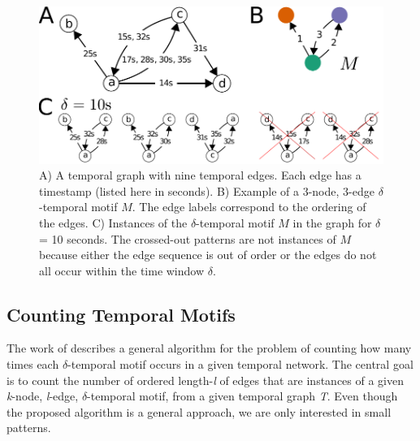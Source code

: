 \documentclass[../../thesis.tex]{subfiles}
\begin{document}
\begin{figure}[H]
\centering
\begin{subfigure}[b]{0.3\textwidth}\label{fig:intro1A}\end{subfigure}
\begin{subfigure}[b]{0.3\textwidth}\label{fig:intro1B}\end{subfigure}
\begin{subfigure}[b]{0.3\textwidth}\label{fig:intro1C}\end{subfigure}
\includegraphics[width=\columnwidth]{content/unveiling/img/intro1}
\caption{%
\textnormal{A}) A temporal graph with nine temporal edges.  Each edge
has a timestamp (listed here in seconds).
%
\textnormal{B}) Example of a $3$-node, $3$-edge $\delta$-temporal motif $M$.  The
edge labels correspond to the ordering of the edges.
%
\textnormal{C})
Instances of the $\delta$-temporal motif $M$ in the graph for $\delta$ = 10
seconds.  The crossed-out patterns are not instances of $M$ because either the
edge sequence is out of order or the edges do not all occur within the time
window $\delta$.
%
\vspace{-0.7cm}
}
\label{fig:intro1}
\end{figure}

\subsection{Counting Temporal Motifs}
\label{sec:motifs_couting}


The work of \citeauthor{temporalMotifs} describes a general algorithm for the problem of counting how many times each $\delta$-temporal motif occurs in a given temporal network. The central goal is to count the number of ordered length-\textit{l} of edges that are instances of a given \textit{k}-node, \textit{l}-edge, $\delta$-temporal motif, from a given temporal graph \textit{T}.  Even though the proposed algorithm is a general approach, we are only interested in small patterns. 
\end{document}
